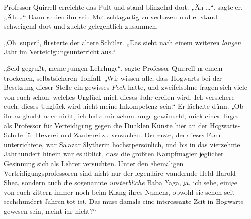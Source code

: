 Professor Quirrell erreichte das Pult und stand blinzelnd dort. „Äh …“, sagte er. „Äh …“ Dann schien ihn sein Mut schlagartig zu verlassen und er stand schweigend dort und zuckte gelegentlich zusammen.

„Oh, super“, flüsterte der ältere Schüler.
„Das sieht nach einem weiteren \emph{langen} Jahr im Verteidigungsunterricht aus.“

„Seid gegrüßt, meine jungen Lehrlinge“, sagte Professor Quirrell in einem trockenen, selbstsicheren Tonfall.
„Wir wissen alle, dass Hogwarts bei der Besetzung dieser Stelle ein gewisses \emph{Pech} hatte, und zweifelsohne fragen sich viele von euch schon, welches Unglück mich dieses Jahr ereilen wird. Ich versichere euch, dieses Unglück wird nicht meine Inkompetenz sein.“ Er lächelte dünn.
„Ob ihr es glaubt oder nicht, ich habe mir schon lange gewünscht, mich eines Tages als Professor für Verteidigung gegen die Dunklen Künste hier an der Hogwarts-Schule für Hexerei und Zauberei zu versuchen. Der erste, der dieses Fach unterrichtete, war Salazar Slytherin höchstpersönlich, und bis in das vierzehnte Jahrhundert hinein war es üblich, dass die größten Kampfmagier jeglicher Gesinnung sich als Lehrer versuchten. Unter den ehemaligen Verteidigungsprofessoren sind nicht nur der legendäre wandernde Held Harold Shea, sondern auch die sogenannte \emph{unsterbliche} Baba Yaga, ja, ich sehe, einige von euch zittern immer noch beim Klang ihres Namens, obwohl sie schon seit sechshundert Jahren tot ist. Das muss damals eine interessante Zeit in Hogwarts gewesen sein, meint ihr nicht?“

